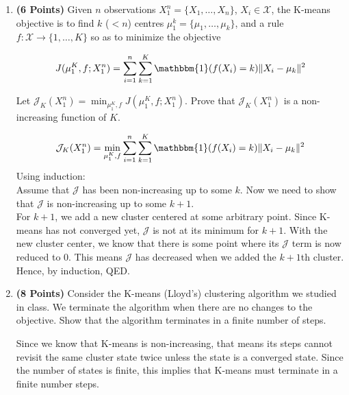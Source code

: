 \documentclass[a4paper]{article}
\newcounter{thm}
\newcommand{\Xcal}{\mathcal{X}}
\newcommand{\Jcal}{\mathcal{J}}
\newcommand{\indfone}{\mathbbm{1}}
\theoremstyle{definition}
\newenvironment{soln}{
    \leavevmode\color{blue}\ignorespaces
}{}
\begin{document}
\begin{enumerate}

\item \textbf{(6 Points)}
Given $n$ observations $X_1^n = \{X_1, \dots, X_n\}$, $X_i \in \Xcal$, the K-means objective
is to find $k$
($<n$) centres $\mu_1^k = \{\mu_1, \dots, \mu_k\}$, and a rule $f:\Xcal \rightarrow
\{1,\dots, K\}$ so as to minimize the objective

\begin{equation}
J(\mu_1^K, f; X_1^n) = \sum_{i=1}^n \sum_{k=1}^K \indfone(f(X_i) = k) \|X_i - \mu_k\|^2
\label{eqn:kmeans}
\end{equation}

Let $\Jcal_K(X_1^n) = \min_{\mu_1^K, f} J(\mu_1^K, f; X_1^n)$. Prove that
$\Jcal_{K}(X_1^n)$ is a non-increasing function of $K$.

\begin{soln}
    \begin{equation*}
    \Jcal_K(X_1^n) = \min_{\mu_1^K, f} \sum_{i=1}^n \sum_{k=1}^K \indfone(f(X_i) = k) \|X_i - \mu_k\|^2
    \end{equation*}
    Using induction: \\
    Assume that $\Jcal$ has been non-increasing up to some $k$. Now we need to show that $\Jcal$ is non-increasing up to some $k+1$. \\
    For $k+1$, we add a new cluster centered at some arbitrary point. Since K-means has not converged yet, $\Jcal$ is not at its minimum for $k+1$. With the new cluster center, we know that there is some point where its $\Jcal$ term is now reduced to 0. This means $\Jcal$ has decreased when we added the $k+1$th cluster. Hence, by induction, QED.
\end{soln}

\item \textbf{(8 Points)}
Consider the K-means (Lloyd's) clustering algorithm we studied in class. We
terminate the algorithm when there are no changes to the objective.
Show that the algorithm terminates in a finite number of steps.

\begin{soln}
    Since we know that K-means is non-increasing, that means its steps cannot revisit the same cluster state twice unless the state is a converged state. Since the number of states is finite, this implies that K-means must terminate in a finite number steps.
\end{soln}

\end{enumerate}
\end{document}
